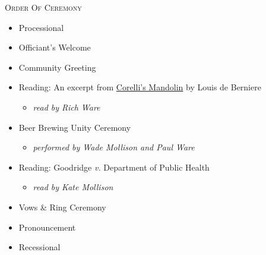 \documentclass[12pt]{article}
\begin{document}
\begin{minipage}[t]{0.495\textwidth}
\centering

\textsc{Order Of Ceremony}

\begin{itemize}

\item [] Processional
\item [] Officiant's Welcome
\item [] Community Greeting
\item [] Reading: An excerpt from \underline{Corelli's Mandolin} by Louis de Berniere
\begin{itemize}[topsep=-5pt,itemsep=-1ex,partopsep=1ex,parsep=1ex]
\item [] \textit{read by Rich Ware}
\end{itemize}

\item [] Beer Brewing Unity Ceremony
\begin{itemize}[topsep=-5pt,itemsep=-1ex,partopsep=1ex,parsep=1ex]
\item [] \textit{performed by Wade Mollison and Paul Ware}
\end{itemize}

\item [] Reading: Goodridge \textit{v.} Department of Public Health
\begin{itemize}[topsep=-5pt,itemsep=-1ex,partopsep=1ex,parsep=1ex]
\item [] \textit{read by Kate Mollison}

\end{itemize}

%
%

\item [] Vows \& Ring Ceremony
\item [] Pronouncement
\item [] Recessional
\end{itemize}

\end{minipage}
\end{document}
